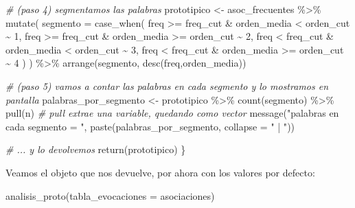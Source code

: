 \documentclass[
]{book}
\newenvironment{Shaded}{\begin{snugshade}}{\end{snugshade}}
\newcommand{\AttributeTok}[1]{\textcolor[rgb]{0.77,0.63,0.00}{#1}}
\newcommand{\CommentTok}[1]{\textcolor[rgb]{0.56,0.35,0.01}{\textit{#1}}}
\newcommand{\DecValTok}[1]{\textcolor[rgb]{0.00,0.00,0.81}{#1}}
\newcommand{\FunctionTok}[1]{\textcolor[rgb]{0.00,0.00,0.00}{#1}}
\newcommand{\NormalTok}[1]{#1}
\newcommand{\OtherTok}[1]{\textcolor[rgb]{0.56,0.35,0.01}{#1}}
\newcommand{\SpecialCharTok}[1]{\textcolor[rgb]{0.00,0.00,0.00}{#1}}
\newcommand{\StringTok}[1]{\textcolor[rgb]{0.31,0.60,0.02}{#1}}
\begin{document}
\begin{Shaded}
\begin{Highlighting}[]
  \CommentTok{\# (paso 4) segmentamos las palabras}
\NormalTok{  prototipico }\OtherTok{\textless{}{-}}\NormalTok{ asoc\_frecuentes }\SpecialCharTok{\%\textgreater{}\%} \FunctionTok{mutate}\NormalTok{( }\AttributeTok{segmento =} \FunctionTok{case\_when}\NormalTok{(}
\NormalTok{    freq }\SpecialCharTok{\textgreater{}=}\NormalTok{ freq\_cut }\SpecialCharTok{\&}\NormalTok{ orden\_media }\SpecialCharTok{\textless{}}\NormalTok{ orden\_cut }\SpecialCharTok{\textasciitilde{}} \DecValTok{1}\NormalTok{,}
\NormalTok{    freq }\SpecialCharTok{\textgreater{}=}\NormalTok{ freq\_cut }\SpecialCharTok{\&}\NormalTok{ orden\_media }\SpecialCharTok{\textgreater{}=}\NormalTok{ orden\_cut }\SpecialCharTok{\textasciitilde{}} \DecValTok{2}\NormalTok{,}
\NormalTok{    freq }\SpecialCharTok{\textless{}}\NormalTok{ freq\_cut }\SpecialCharTok{\&}\NormalTok{ orden\_media }\SpecialCharTok{\textless{}}\NormalTok{ orden\_cut }\SpecialCharTok{\textasciitilde{}} \DecValTok{3}\NormalTok{,}
\NormalTok{    freq }\SpecialCharTok{\textless{}}\NormalTok{ freq\_cut }\SpecialCharTok{\&}\NormalTok{ orden\_media }\SpecialCharTok{\textgreater{}=}\NormalTok{ orden\_cut }\SpecialCharTok{\textasciitilde{}} \DecValTok{4} 
\NormalTok{  )}
\NormalTok{  ) }\SpecialCharTok{\%\textgreater{}\%} \FunctionTok{arrange}\NormalTok{(segmento, }\FunctionTok{desc}\NormalTok{(freq,orden\_media))}
  
  \CommentTok{\# (paso 5) vamos a contar las palabras en cada segmento y lo mostramos en pantalla}
\NormalTok{  palabras\_por\_segmento }\OtherTok{\textless{}{-}}\NormalTok{ prototipico }\SpecialCharTok{\%\textgreater{}\%} 
    \FunctionTok{count}\NormalTok{(segmento) }\SpecialCharTok{\%\textgreater{}\%}
    \FunctionTok{pull}\NormalTok{(n) }\CommentTok{\# pull extrae una variable, quedando como vector}
  \FunctionTok{message}\NormalTok{(}\StringTok{"palabras en cada segmento = "}\NormalTok{, }
          \FunctionTok{paste}\NormalTok{(palabras\_por\_segmento, }\AttributeTok{collapse =} \StringTok{" | "}\NormalTok{))}
  
  \CommentTok{\# ... y lo devolvemos}
  \FunctionTok{return}\NormalTok{(prototipico) }
\NormalTok{\}}
\end{Highlighting}
\end{Shaded}

Veamos el objeto que nos devuelve, por ahora con los valores por defecto:

\begin{Shaded}
\begin{Highlighting}[]
\FunctionTok{analisis\_proto}\NormalTok{(}\AttributeTok{tabla\_evocaciones =}\NormalTok{ asociaciones)}
\end{Highlighting}
\end{Shaded}
\end{document}
